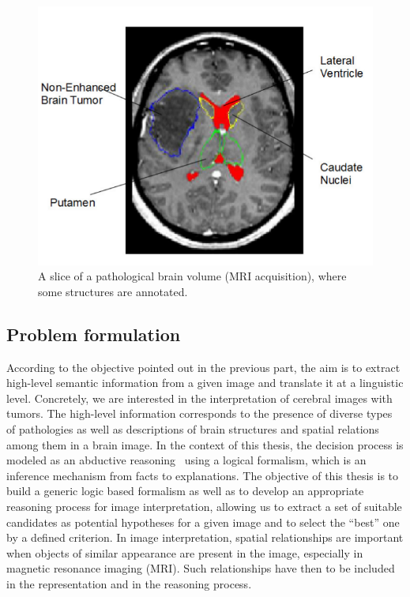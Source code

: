\documentclass{article}
\begin{document}
  \begin{figure}[h]
  \centering
   \includegraphics[scale=.2]{./figures/patho_brain.png}
   \caption{\label{fig:patho_brain} A slice of a pathological brain volume (MRI acquisition), where some structures are annotated.}
 \end{figure} 
\subsection{Problem formulation}
According to the objective pointed out in the previous part, the aim is to extract high-level semantic information from a given image and translate it at a linguistic level.
Concretely, we are interested in the interpretation of cerebral images with tumors. The high-level information corresponds to the presence of diverse types of pathologies
 as well as descriptions of brain structures and spatial relations among them in a brain image. 
 In the context of this thesis, the decision process is modeled as an abductive reasoning~\cite{aliseda1997seeking} using a logical formalism, 
 which is an inference mechanism from facts to explanations.
The objective of this thesis is to build a generic logic based formalism as well as  to develop an appropriate reasoning process for image interpretation, 
 allowing us to extract a set of suitable candidates as potential hypotheses for a given image and to select the ``best'' one by a defined criterion.  
 In image interpretation, spatial relationships are important when objects of similar appearance are present in the image, especially in magnetic resonance imaging (MRI).
 Such relationships have then to be included in the representation and in the reasoning process.
  
\end{document}
